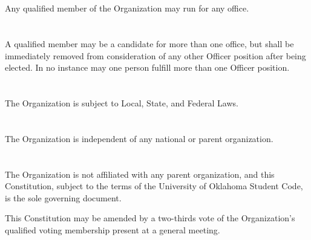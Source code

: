 \documentclass[12pt]{cls/constitution}
\begin{document}
\section{}
Any qualified member of the Organization may run for any office.

\section{}
A qualified member may be a candidate for more than one office, but shall be immediately removed from consideration of any other Officer position after being elected. In no instance may one person fulfill more than one Officer position. 


\section{}
The Organization is subject to Local, State, and Federal Laws.

\section{}
The Organization is independent of any national or parent organization.

\section{}
The Organization is not affiliated with any parent organization, and this Constitution, subject to the terms of the University of Oklahoma Student Code, is the sole governing document.

This Constitution may be amended by a two-thirds vote of the Organization’s qualified voting membership present at a general meeting. 
\end{document}
